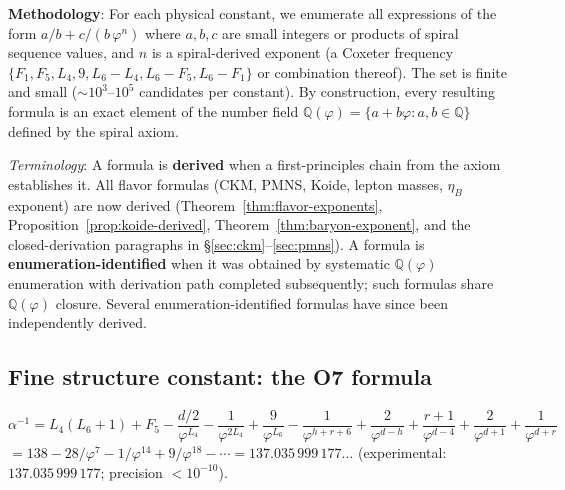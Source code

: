 \documentclass[12pt,a4paper]{article}
\begin{document}
\textbf{Methodology}: For each physical constant, we enumerate all expressions of the form $a/b + c/(b\,\varphi^n)$ where $a, b, c$ are small integers or products of spiral sequence values, and $n$ is a spiral-derived exponent (a Coxeter frequency $\{F_1, F_5, L_4, 9, L_6{-}L_4, L_6{-}F_5, L_6{-}F_1\}$ or combination thereof). The set is finite and small ($\sim 10^3$--$10^5$ candidates per constant). By construction, every resulting formula is an exact element of the number field $\mathbb{Q}(\varphi) = \{a + b\varphi : a,b \in \mathbb{Q}\}$ defined by the spiral axiom.

\noindent\emph{Terminology}: A formula is \textbf{derived} when a first-principles chain from the axiom establishes it. All flavor formulas (CKM, PMNS, Koide, lepton masses, $\eta_B$ exponent) are now derived (Theorem~\ref{thm:flavor-exponents}, Proposition~\ref{prop:koide-derived}, Theorem~\ref{thm:baryon-exponent}, and the closed-derivation paragraphs in \S\ref{sec:ckm}--\ref{sec:pmns}). A formula is \textbf{enumeration-identified} when it was obtained by systematic $\mathbb{Q}(\varphi)$ enumeration with derivation path completed subsequently; such formulas share $\mathbb{Q}(\varphi)$ closure. Several enumeration-identified formulas have since been independently derived.

\subsection{Fine structure constant: the O7 formula}

\begin{equation}
\boxed{\alpha^{-1} = L_4(L_6{+}1) + F_5 - \frac{d/2}{\varphi^{L_4}} - \frac{1}{\varphi^{2L_4}} + \frac{9}{\varphi^{L_6}} - \frac{1}{\varphi^{h+r+6}} + \frac{2}{\varphi^{d-h}} + \frac{r{+}1}{\varphi^{d-4}} + \frac{2}{\varphi^{d+1}} + \frac{1}{\varphi^{d+r}}}
\end{equation}
$= 138 - 28/\varphi^7 - 1/\varphi^{14} + 9/\varphi^{18} - \cdots = 137.035\,999\,177\ldots$ (experimental: $137.035\,999\,177$; precision $< 10^{-10}$).
\end{document}
